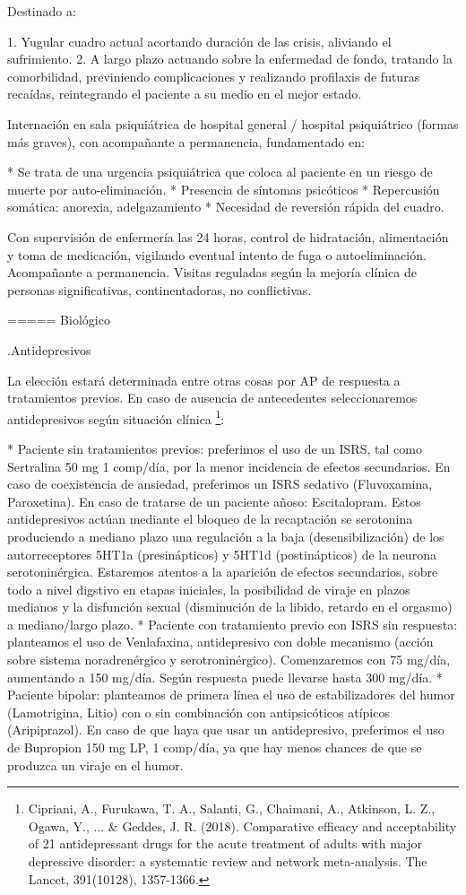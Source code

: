 Destinado a:

1. Yugular cuadro actual acortando duración de las crisis, aliviando el sufrimiento.
2. A largo plazo actuando sobre la enfermedad de fondo, tratando la comorbilidad, previniendo complicaciones y realizando profilaxis de futuras recaídas, reintegrando el paciente a su medio en el mejor estado.

Internación en sala psiquiátrica de hospital general / hospital psiquiátrico (formas más graves), con acompañante a permanencia, fundamentado en:

* Se trata de una urgencia psiquiátrica que coloca al paciente en un riesgo de muerte por auto-eliminación.
* Presencia de síntomas psicóticos
* Repercusión somática: anorexia, adelgazamiento
* Necesidad de reversión rápida del cuadro.

Con supervisión de enfermería las 24 horas, control de hidratación, alimentación y toma de medicación, vigilando eventual intento de fuga o autoeliminación. Acompañante a permanencia. Visitas reguladas según la mejoría clínica de personas significativas, continentadoras, no conflictivas.

===== Biológico

.Antidepresivos

La elección estará determinada entre otras cosas por AP de respuesta a tratamientos previos. En caso de ausencia de antecedentes seleccionaremos antidepresivos según situación clínica \footnote{Cipriani, A., Furukawa, T. A., Salanti, G., Chaimani, A., Atkinson, L. Z., Ogawa, Y., ... \& Geddes, J. R. (2018). Comparative efficacy and acceptability of 21 antidepressant drugs for the acute treatment of adults with major depressive disorder: a systematic review and network meta-analysis. The Lancet, 391(10128), 1357-1366.}:

* Paciente sin tratamientos previos: preferimos el uso de un ISRS, tal como Sertralina 50 mg 1 comp/día, por la menor incidencia de efectos secundarios. En caso de coexistencia de ansiedad, preferimos un ISRS sedativo (Fluvoxamina, Paroxetina). En caso de tratarse de un paciente añoso: Escitalopram. Estos antidepresivos actúan mediante el bloqueo de la recaptación se serotonina produciendo a mediano plazo una regulación a la baja (desensibilización) de los autorreceptores 5HT1a (presinápticos) y 5HT1d (postinápticos) de la neurona serotoninérgica. Estaremos atentos a la aparición de efectos secundarios, sobre todo a nivel digstivo en etapas iniciales, la posibilidad de viraje en plazos medianos y la disfunción sexual (disminución de la libido, retardo en el orgasmo) a mediano/largo plazo.
* Paciente con tratamiento previo con ISRS sin respuesta: planteamos el uso de Venlafaxina, antidepresivo con doble mecanismo (acción sobre sistema noradrenérgico y serotroninérgico). Comenzaremos con 75 mg/día, aumentando a 150 mg/día. Según respuesta puede llevarse hasta 300 mg/día.
* Paciente bipolar: planteamos de primera línea el uso de estabilizadores del humor (Lamotrigina, Litio) con o sin combinación con antipsicóticos atípicos (Aripiprazol). En caso de que haya que usar un antidepresivo, preferimos el uso de Bupropion 150 mg LP, 1 comp/día, ya que hay menos chances de que se produzca un viraje en el humor.

